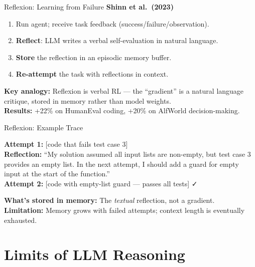 \documentclass[aspectratio=169,10pt]{beamer}
\begin{document}
\begin{frame}{Reflexion: Learning from Failure}
  \textbf{Shinn et al.\ (2023)}~\cite{shinn2023reflexion}
  \vspace{0.4em}
  \begin{tcolorbox}[hitbox, title=Reflexion Loop]
    \begin{enumerate}
      \item Run agent; receive task feedback (success/failure/observation).
      \item \textbf{Reflect}: LLM writes a verbal self-evaluation in natural language.
      \item \textbf{Store} the reflection in an episodic memory buffer.
      \item \textbf{Re-attempt} the task with reflections in context.
    \end{enumerate}
  \end{tcolorbox}
  \vspace{0.3em}
  \textbf{Key analogy:} Reflexion is verbal RL — the ``gradient'' is a natural language critique, stored in memory rather than model weights.
  \vspace{0.3em}\\
  \textbf{Results:} +22\% on HumanEval coding, +20\% on AlfWorld decision-making.
\end{frame}

\begin{frame}{Reflexion: Example Trace}
  \begin{tcolorbox}[hitbox]
    \textbf{Attempt 1:} [code that fails test case 3] \\[4pt]
    \textbf{Reflection:} ``My solution assumed all input lists are non-empty, but test case 3 provides an empty list.
    In the next attempt, I should add a guard for empty input at the start of the function.''\\[4pt]
    \textbf{Attempt 2:} [code with empty-list guard — passes all tests] ✓
  \end{tcolorbox}
  \vspace{0.4em}
  \textbf{What's stored in memory:} The \emph{textual} reflection, not a gradient.\\
  \textbf{Limitation:} Memory grows with failed attempts; context length is eventually exhausted.
\end{frame}

\section{Limits of LLM Reasoning}
\end{document}
